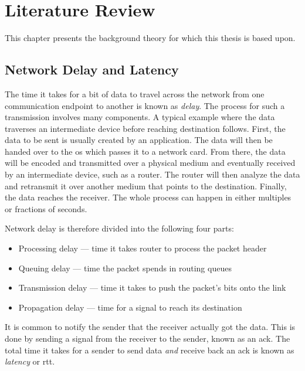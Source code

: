 \chapter{Literature Review}

This chapter presents the background theory for which this thesis is based upon.



\section{Network Delay and Latency}

The time it takes for a bit of data to travel across the network from one communication endpoint to another is known as \textit{delay}. The process for such a transmission involves many components. A typical example where the data traverses an intermediate device before reaching destination follows. First, the data to be sent is usually created by an application. The data will then be handed over to the \gls{os} which passes it to a network card. From there, the data will be encoded and transmitted over a physical medium and eventually received by an intermediate device, such as a router. The router will then analyze the data and retransmit it over another medium that points to the destination. Finally, the data reaches the receiver. The whole process can happen in either multiples or fractions of seconds.


Network delay is therefore divided into the following four parts:

\begin{itemize}
    \item Processing delay --- time it takes router to process the packet header
    \item Queuing delay --- time the packet spends in routing queues
    \item Transmission delay --- time it takes to push the packet's bits onto the link
    \item Propagation delay --- time for a signal to reach its destination
\end{itemize}

It is common to notify the sender that the receiver actually got the data. This is done by sending a signal from the receiver to the sender, known as an \gls{ack}. The total time it takes for a sender to send data \textit{and} receive back an \gls{ack} is known as \textit{latency} or \gls{rtt}.

